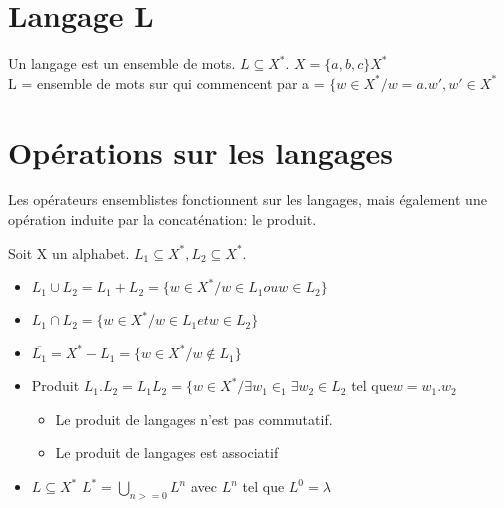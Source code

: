 \documentclass[12pt,a4paper,openany]{book}
\begin{document}
	\section{Langage L}
	Un langage est un ensemble de mots. $L \subseteq X^*$. $X=\{a,b,c\} X^*$\\
	L = ensemble de mots sur  qui commencent par a = $\{w \in X^* / w = a.w', w'\in X^*$
	\section{Opérations sur les langages}
	Les opérateurs ensemblistes fonctionnent sur les langages, mais également une opération induite par la concaténation: le produit.
	
	Soit X un alphabet. $L_1 \subseteq X^*, L_2 \subseteq X^*$.
	\begin{itemize}
		\item $L_1 \cup L_2 = L_1 + L_2 = \{w \in X^*/w \in L_1 ou w\in L_2\}$
		\item $L_1 \cap L_2 = \{w \in X^*/w\in L_1 et w\in L_2\}$
		\item $\overline{L_1} = X^* - L_1 = \{w \in X^* / w \not\in L_1\}$
		\item Produit $L_1 . L_2 = L_1 L_2 = \{w\in X^* / \exists w_1 \in _1 \exists w_2 \in L_2$ tel que$w = w_1 . w_2$ 
	\begin{attention}
		\begin{itemize}
			\item Le produit de langages n'est pas commutatif.
			\item Le produit de langages est associatif
		\end{itemize}
	\end{attention}

\item $L \subseteq X^*$ $L^* = \bigcup_{n >= 0}L^n$ avec $L^n$ tel que $L^0 = \lambda$
	\end{itemize}
\end{document}
